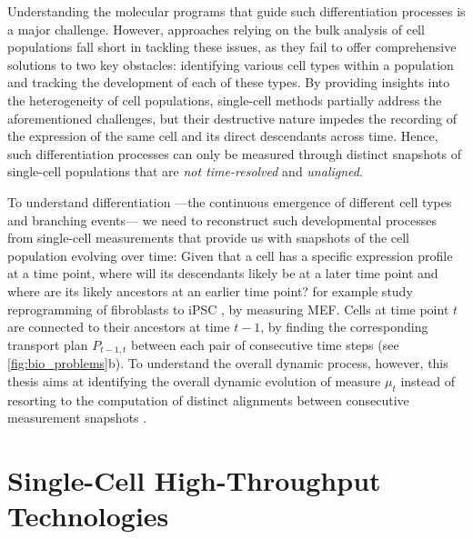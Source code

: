 Understanding the molecular programs that guide such differentiation processes is a major challenge.
However, approaches relying on the bulk analysis of cell populations fall short in tackling these issues, as they fail to offer comprehensive solutions to two key obstacles: identifying various cell types within a population and tracking the development of each of these types.
By providing insights into the heterogeneity of cell populations, single-cell methods partially address the aforementioned challenges, but their destructive nature impedes the recording of the expression of the same cell and its direct descendants across time.
Hence, such differentiation processes can only be measured through distinct snapshots of single-cell populations that are \textit{not time-resolved} and \textit{unaligned}.

To understand differentiation ---the continuous emergence of different cell types and branching events--- we need to reconstruct such developmental processes from single-cell measurements that provide us with snapshots of the cell population evolving over time:
Given that a cell has a specific expression profile at a time point, where will its descendants likely be at a later time point and where are its likely ancestors at an earlier time point? 
\citet{schiebinger2019optimal} for example study reprogramming of fibroblasts to \acrfull{iPSC} \citep{takahashi2006induction}, by measuring \acrfull{MEF}. Cells at time point $t$ are connected to their ancestors at time $t-1$, by finding the corresponding transport plan $P_{t-1,t}$ between each pair of consecutive time steps (see \cref{fig:bio_problems}b).
To understand the overall dynamic process, however, this thesis aims at identifying the overall dynamic evolution of measure $\mu_t$ instead of resorting to the computation of distinct alignments between consecutive measurement snapshots \citep{lavenant2021towards}.


\section{Single-Cell High-Throughput Technologies}
\label{sec:tech_background}

